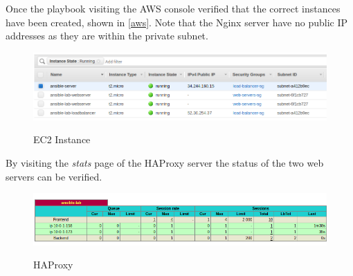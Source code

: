 \documentclass[a4paper]{article}
\begin{document}
  Once the playbook visiting the AWS console verified that the correct instances have been created, shown in \autoref{aws}. Note that the Nginx server have no public IP addresses as they are within the private subnet.
  
  \begin{figure}[H]
    \caption{EC2 Instance}
    \centering
    \includegraphics[width=\textwidth,height=\textheight,keepaspectratio]{aws}
    \label{fig:aws}
  \end{figure}
  
  By visiting the \textit{stats} page of the HAProxy server the status of the two web servers can be verified.
  
  \begin{figure}[H]
    \caption{HAProxy}
    \centering
    \includegraphics[width=\textwidth,height=\textheight,keepaspectratio]{haproxy}
    \label{fig:haproxy}
  \end{figure}
  
  \begin{appendices}
    
    
    
  \end{appendices}
    
	
\end{document}
